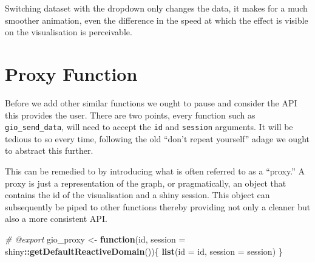 \documentclass[
]{krantz}
\makeatletter
\newenvironment{Shaded}{\begin{snugshade}}{\end{snugshade}}
\newcommand{\CommentTok}[1]{\textcolor[rgb]{0.37,0.37,0.37}{\textit{#1}}}
\newcommand{\ControlFlowTok}[1]{\textcolor[rgb]{0.27,0.27,0.27}{\textbf{#1}}}
\newcommand{\DataTypeTok}[1]{\textcolor[rgb]{0.27,0.27,0.27}{#1}}
\newcommand{\KeywordTok}[1]{\textcolor[rgb]{0.27,0.27,0.27}{\textbf{#1}}}
\newcommand{\NormalTok}[1]{#1}
\newcommand{\OperatorTok}[1]{\textcolor[rgb]{0.43,0.43,0.43}{\textbf{#1}}}
\newcommand{\StringTok}[1]{\textcolor[rgb]{0.5,0.5,0.5}{#1}}
\newenvironment{kframe}{%
\medskip{}
\setlength{\fboxsep}{.8em}
 \def\at@end@of@kframe{}%
 \ifinner\ifhmode%
  \def\at@end@of@kframe{\end{minipage}}%
  \begin{minipage}{\columnwidth}%
 \fi\fi%
 \def\FrameCommand##1{\hskip\@totalleftmargin \hskip-\fboxsep
 \colorbox{shadecolor}{##1}\hskip-\fboxsep
     \hskip-\linewidth \hskip-\@totalleftmargin \hskip\columnwidth}%
 \MakeFramed {\advance\hsize-\width
   \@totalleftmargin\z@ \linewidth\hsize
   \@setminipage}}%
 {\par\unskip\endMakeFramed%
 \at@end@of@kframe}
\renewenvironment{Shaded}{\begin{kframe}}{\end{kframe}}
\makeatother
\begin{document}
\begin{Shaded}
\end{Shaded}

Switching dataset with the dropdown only changes the data, it makes for a much smoother animation, even the difference in the speed at which the effect is visible on the visualisation is perceivable.

\hypertarget{proxy-function}{%
\section{Proxy Function}\label{proxy-function}}

Before we add other similar functions we ought to pause and consider the API this provides the user. There are two points, every function such as \texttt{gio\_send\_data}, will need to accept the \texttt{id} and \texttt{session} arguments. It will be tedious to so every time, following the old ``don't repeat yourself'' adage we ought to abstract this further.

This can be remedied to by introducing what is often referred to as a ``proxy.'' A proxy is just a representation of the graph, or pragmatically, an object that contains the id of the visualisation and a shiny session. This object can subsequently be piped to other functions thereby providing not only a cleaner but also a more consistent API.

\begin{Shaded}
\begin{Highlighting}[]
\CommentTok{\#\textquotesingle{} @export}
\NormalTok{gio\_proxy <{-}}\StringTok{ }\ControlFlowTok{function}\NormalTok{(id, }\DataTypeTok{session =}\NormalTok{ shiny}\OperatorTok{::}\KeywordTok{getDefaultReactiveDomain}\NormalTok{())\{}
  \KeywordTok{list}\NormalTok{(}\DataTypeTok{id =}\NormalTok{ id, }\DataTypeTok{session =}\NormalTok{ session)}
\NormalTok{\}}
\end{Highlighting}
\end{Shaded}
\end{document}
